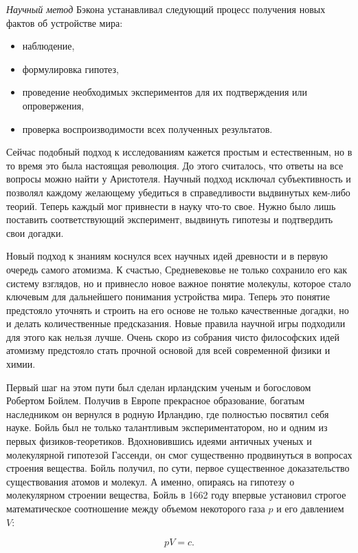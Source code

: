 \textit{Научный метод} Бэкона устанавливал следующий процесс получения новых фактов об устройстве мира: 
\begin{itemize}
    \item наблюдение,
    \item формулировка гипотез,
    \item проведение необходимых экспериментов для их подтверждения или опровержения,
    \item проверка воспроизводимости всех полученных результатов.
\end{itemize}
Сейчас подобный подход к исследованиям кажется простым и естественным, но в то время это была настоящая революция.
До этого считалось, что ответы на все вопросы можно найти у Аристотеля.
Научный подход исключал субъективность и позволял каждому желающему убедиться в справедливости выдвинутых кем-либо теорий.
Теперь каждый мог привнести в науку что-то свое.
Нужно было лишь поставить соответствующий эксперимент, выдвинуть гипотезы и подтвердить свои догадки.

Новый подход к знаниям коснулся всех научных идей древности и в первую очередь самого атомизма.
К счастью, Средневековье не только сохранило его как систему взглядов, но и привнесло новое важное понятие молекулы, которое стало ключевым для дальнейшего понимания устройства мира. 
Теперь это понятие предстояло уточнять и строить на его основе не только качественные догадки, но и делать количественные предсказания.
Новые правила научной игры подходили для этого как нельзя лучше.
Очень скоро из собрания чисто философских идей атомизму предстояло стать прочной основой для всей современной физики и химии.

Первый шаг на этом пути был сделан ирландским ученым и богословом Робертом Бойлем.
Получив в Европе прекрасное образование, богатым наследником он вернулся в родную Ирландию, где полностью посвятил себя науке.
Бойль был не только талантливым экспериментатором, но и одним из первых физиков-теоретиков.
Вдохновившись идеями античных ученых и молекулярной гипотезой Гассенди, он смог существенно продвинуться в вопросах строения вещества. Бойль получил, по сути, первое существенное доказательство существования атомов и молекул.
А именно, опираясь на гипотезу о молекулярном строении вещества, Бойль в 1662 году впервые установил строгое математическое соотношение между объемом некоторого газа $p$ и его давлением $V$:

\begin{equation}\label{eq:boil}
pV = c.
\end{equation}

